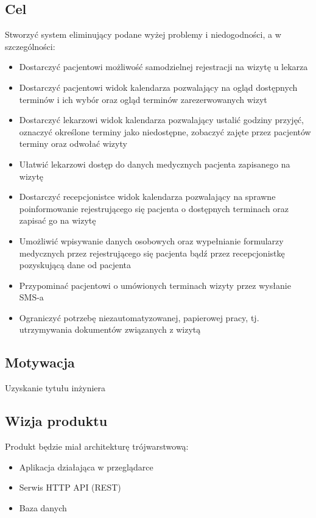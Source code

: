 \documentclass[polish,12pt]{aghthesis}
\begin{document}
\subsection{Cel}
Stworzyć system eliminujący podane wyżej problemy i niedogodności, a w szczególności:

\begin{itemize}
  \item Dostarczyć pacjentowi możliwość samodzielnej rejestracji na wizytę u lekarza
  \item Dostarczyć pacjentowi widok kalendarza pozwalający na ogląd dostępnych terminów i ich wybór oraz ogląd terminów zarezerwowanych wizyt
  \item Dostarczyć lekarzowi widok kalendarza pozwalający ustalić godziny przyjęć, oznaczyć określone terminy jako niedostępne, zobaczyć zajęte przez pacjentów terminy oraz odwołać wizyty
  \item Ułatwić lekarzowi dostęp do danych medycznych pacjenta zapisanego na wizytę
  \item Dostarczyć recepcjonistce widok kalendarza pozwalający na sprawne poinformowanie rejestrującego się pacjenta o dostępnych terminach oraz zapisać go na wizytę
  \item Umożliwić wpisywanie danych osobowych oraz wypełnianie formularzy medycznych przez rejestrującego się pacjenta bądź przez recepcjonistkę pozyskującą dane od pacjenta
  \item Przypominać pacjentowi o umówionych terminach wizyty przez wysłanie SMS-a
  \item Ograniczyć potrzebę niezautomatyzowanej, papierowej pracy, tj. utrzymywania dokumentów związanych z wizytą
\end{itemize}

\subsection{Motywacja}
Uzyskanie tytułu inżyniera

\subsection{Wizja produktu}
Produkt będzie miał architekturę trójwarstwową:

\begin{itemize}
  \item Aplikacja działająca w przeglądarce
  \item Serwis HTTP API (REST)
  \item Baza danych
\end{itemize}
\end{document}
